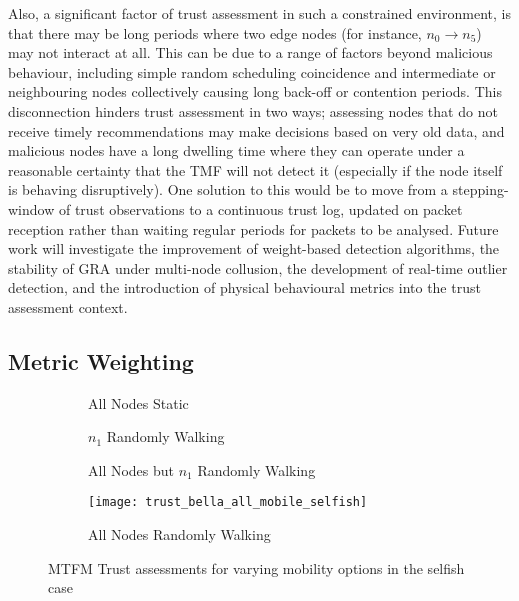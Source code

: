 Also, a significant factor of trust assessment in such a constrained environment, is that there may be long periods where two edge nodes (for instance, $n_0 \to n_5$) may not interact at all. 
This can be due to a range of factors beyond malicious behaviour, including simple random scheduling coincidence and intermediate or neighbouring nodes collectively causing long back-off or contention periods.
This disconnection hinders trust assessment in two ways; assessing nodes that do not receive timely recommendations may make decisions based on very old data, and malicious nodes have a long dwelling time where they can operate under a reasonable certainty that the TMF will not detect it (especially if the node itself is behaving disruptively).
One solution to this would be to move from a stepping-window of trust observations to a continuous trust log, updated on packet reception rather than waiting regular periods for packets to be analysed.
Future work will investigate the improvement of weight-based detection algorithms, the stability of GRA under multi-node collusion, the development of real-time outlier detection, and the introduction of physical behavioural metrics into the trust assessment context.



\subsection{Metric Weighting}
\begin{figure}
\begin{subfigure}{.5\textwidth}
  \centering
  \caption{All Nodes Static}
  \label{fig:selfish_trust_static}
\end{subfigure}%
\begin{subfigure}{.5\textwidth}
  \centering
  \caption{$n_1$ Randomly Walking}
  \label{fig:selfish_trust_single}
\end{subfigure}
\begin{subfigure}{.5\textwidth}
\centering
  \caption{All Nodes but $n_1$ Randomly Walking}
  \label{fig:selfish_trust_allbut1}
\end{subfigure}
\begin{subfigure}{.5\textwidth}
\centering
  \texttt{[image: trust\_bella\_all\_mobile\_selfish]}
  \caption{All Nodes Randomly Walking}
  \label{fig:selfish_trust_all_mobile}
\end{subfigure}
\caption{MTFM Trust assessments for varying mobility options in the selfish case}
\label{fig:trust_mobility}
\end{figure}



